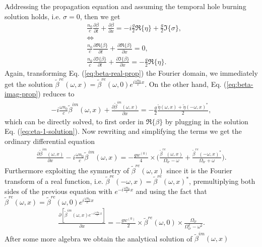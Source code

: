 \documentclass[onecolumn,secnumarabic,amssymb, nobibnotes, aip, prd]{revtex4-1}
\def\p{\partial}
\def\t{\tilde}
\def\om{\omega}
\begin{document}
Addressing the propagation equation and assuming the temporal hole burning solution holds, i.e. $\sigma = 0$, then we get 
\begin{subequations}
\label{eq:propagation-eq2}
\begin{align}
&\frac{n_0}{c}\frac{\p \beta}{\p t} + \frac{\p \beta}{\p x} = -i\frac{g}{2}\Re\{\eta\}+\frac{g}{2}\Im\{\sigma\}, \nonumber \\
	&{\Leftrightarrow} \nonumber \\
&	\frac{n_0}{c}\frac{\p \Re\{\beta\}}{\p t} + \frac{\p \Re\{\beta\}}{\p x} = 0, \label{eq:beta-real-prop} \\
&	\frac{n_0}{c}\frac{\p \Im\{\beta\}}{\p t} + \frac{\p \Im\{\beta\}}{\p x} = -\frac{g}{2}\Re\{\eta\}. \label{eq:beta-imag-prop} 
\end{align}
\end{subequations}
Again, transforming Eq. (\ref{eq:beta-real-prop}) the Fourier domain, we immediately get the solution $\t\beta^{re}(\om,x) = \t\beta^{re}(\om,0)e^{i\frac{\om n_0}{c}x}$. On the other hand, Eq. (\ref{eq:beta-imag-prop}) reduces to 
\begin{align}
-i\frac{\om n_0}{c}\t\beta^{im}(\omega,x) + \frac{\p \t\beta^{im}(\omega,x)}{\p x} = -\frac{g}{2}\frac{\t\eta(\om,x)+\t\eta(-\om,x)^*}{2}, \label{eq:beta-imag-prop-fourier} 
\end{align}
which can be directly solved, to first order in $\Re\{\beta\}$ by plugging in the solution Eq. (\ref{eq:eta-1-solution}). Now rewriting and simplifying the terms we get the ordinary differential equation 
\begin{align}
\frac{\p \t\beta^{im}(\omega,x)} {\p x} -i\frac{\om n_0}{c}\t\beta^{im}(\omega,x)  = -\frac{g w^{(0)} }{4}\times  \big(\frac{\t\beta^{re}(\om,x)}{\Omega_{lr}-\om} + \frac{\t\beta^{re}(-\om,x)^* }{\Omega_{lr}+\om} \big).
\end{align}
Furthermore exploiting the symmetry of $\t\beta^{re}(\om,x)$ since it is the Fourier transform of a real function, i.e.  $\t\beta^{re}(-\om,x)  =  \t\beta^{re}(\om,x)^*$, premultiplying both sides of the previous equation with $e^{-i\frac{\om n_0}{c}x}$ and using the fact that $\t\beta^{re}(\om,x) = \t\beta^{re}(\om,0)e^{i\frac{\om n_0}{c}x}$
\begin{align}
\frac{\p \left [ \t\beta^{im}(\omega,x)e^{-i\frac{\om n_0}{c}x} \right] } {\p x}  = -\frac{g w^{(0)} }{2}\times  \t\beta^{re}(\om,0) \times\frac{\Omega_{lr}}{\Omega_{lr}^2-\om^2}.
\end{align}
After some more algebra we obtain the analytical solution of $\t\beta^{im}(\om,x)$
\end{document}
